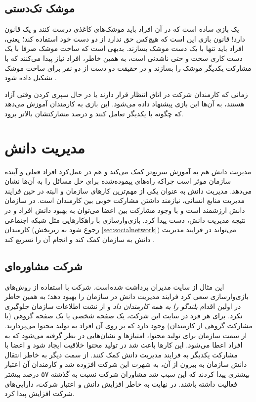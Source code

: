 \subsection{موشک تک‌دستی}
یک بازی ساده است که در آن افراد باید موشک‌های کاغذی درست کنند و یک قانون دارد! قانون بازی این است که هیچ‌کس حق ندارد از دو دست خود استفاده کند؛ یعنی، افراد باید تنها با یک دست موشک بسازند. بدیهی است که ساخت موشک صرفا با یک دست کاری سخت و حتی ناشدنی است، به همین خاطر، افراد نیاز پیدا می‌کنند که با مشارکت یکدیگر موشک را بسازند و در حقیقت دو دست از دو نفر برای ساخت موشک تشکیل داده شود \cite{tedx}.

زمانی که کارمندان شرکت در اتاق انتظار قرار دارند یا در حال سپری کردن وقتی آزاد هستند، به آن‌ها این بازی پیشنهاد داده می‌شود. این بازی به کارمندان آموزش می‌دهد که چگونه با یکدیگر تعامل کنند و درصد مشارکتشان بالاتر برود.
\section{مدیریت دانش}
مدیریت دانش هم به آموزش سریع‌تر کمک می‌کند و هم در عمل‌کرد افراد فعلی و آینده سازمان موثر است چراکه راه‌های پیموده‌شده برای حل مسائل را به آن‌ها نشان می‌دهد. مدیریت دانش به عنوان یکی از مهم‌ترین کارهای سازمان و البته در حین فرایند مدیریت منابع انسانی، نیازمند داشتن مشارکت خوبی بین کارمندان است. در سازمان دانش ارزشمند است \cite{mrg} و با وجود مشارکت بین اعضا می‌توان به بهبود دانش افراد و در نتیجه مدیریت دانش، دست پیدا کرد. بازی‌وارسازی با راهکارهایی مثل شبکه اجتماعی کارمندان (رجوع شود به زیربخش \ref{sec:socialnetwork}) می‌تواند در فرایند مدیریت دانش به سازمان کمک کند و انجام آن را تسریع کند \cite{amiriamin}.
\subsection{شرکت مشاوره‌ای }
این مثال از سایت مدیران \cite{modiran} برداشت شده‌است. شرکت  با استفاده از روش‌های بازی‌وارسازی سعی کرد فرایند مدیریت دانش در سازمان را بهبود دهد؛ به همین خاطر در اولین اقدام \emph{بلندگو را به همه کارمندان داد} و از نشت اطلاعات سازمان جلوگیری نکرد. برای هر فرد در سایت این شرکت، یک صفحه شخصی یا یک صفحه گروهی (با مشارکت گروهی از کارمندان) وجود دارد که بر روی آن افراد به تولید محتوا می‌پردازند. از سمت سازمان برای تولید محتوا، امتیازها و نشان‌هایی در نظر گرفته می‌شود که به افراد اعطا می‌شود. این کارها باعث شد در تولید محتوا خلاقیت ایجاد شود و اعضا با مشارکت یکدیگر به فرایند مدیریت دانش کمک کنند. از سمت دیگر به خاطر انتقال دانش سازمان به بیرون از آن، به شهرت این شرکت افزوده شد و کارمندان آن اعتبار بیشتری پیدا کردند که این سبب شد مشاوران شرکت نسبت به گذشته ۵۷ درصد بیشتر فعالیت داشته باشند. در نهایت به خاطر افزایش دانش و اعتبار شرکت، دارایی‌های شرکت افزایش پیدا کرد.

